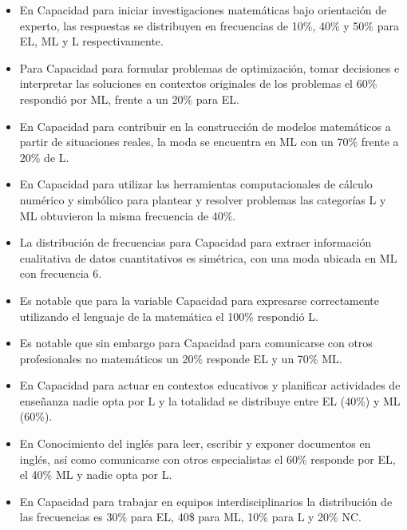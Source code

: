 \documentclass[a4paper,10pt,BCOR10mm,oneside,headsepline]{scrbook}
\begin{document}
\begin{itemize}
\item En Capacidad para iniciar investigaciones matemáticas bajo orientación de experto, las respuestas se distribuyen en frecuencias de 10\%, 40\% y 50\% para EL, ML y L respectivamente.

\item Para Capacidad para formular problemas de optimización, tomar decisiones e interpretar las soluciones en contextos originales de los problemas el 60\% respondió por ML, frente a un 20\% para EL.

\item En Capacidad para contribuir en la construcción de modelos matemáticos a partir de situaciones reales, la moda se encuentra en ML con un 70\% frente a 20\% de L.

\item En Capacidad para utilizar las herramientas computacionales de cálculo numérico y simbólico para plantear y resolver problemas las categorías L y ML obtuvieron la misma frecuencia de 40\%.

\item La distribución de frecuencias para Capacidad para extraer información cualitativa de datos cuantitativos es simétrica, con una moda ubicada en ML con frecuencia 6.

\item Es
notable que para la variable Capacidad para expresarse correctamente utilizando el lenguaje de la matemática el 100\% respondió L.

\item Es notable que sin embargo para Capacidad para comunicarse con otros profesionales no matemáticos un 20\% responde EL y un 70\% ML.

\item En Capacidad para actuar en contextos educativos y planificar actividades de enseñanza nadie opta por L y la totalidad se distribuye entre EL (40\%) y ML (60\%).

\item En Conocimiento del inglés para leer, escribir y exponer documentos en inglés, así como comunicarse con otros especialistas el 60\% responde por EL, el 40\% ML y nadie opta por L.

\item En Capacidad para trabajar en equipos interdisciplinarios la distribución de las frecuencias es 30\% para EL, 40\$ para ML, 10\% para L y 20\% NC.

\end{itemize}
\end{document}
